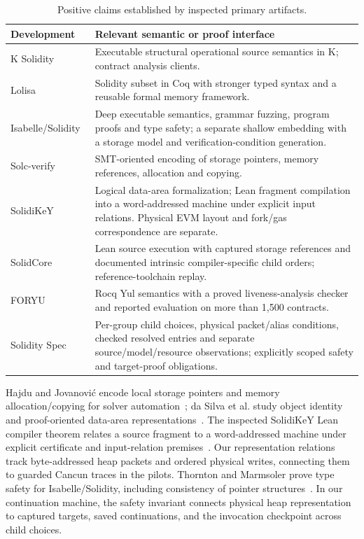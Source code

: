 \documentclass[conference]{IEEEtran}
\begin{document}
\begin{table}[t]
\caption{Positive claims established by inspected primary artifacts.}
\label{tab:related}
\small
\begin{tabularx}{\columnwidth}{@{}>{\raggedright\arraybackslash}p{}X@{}}
\toprule
Development & Relevant semantic or proof interface \\
\midrule
K Solidity~\cite{ksolidity} & Executable structural operational source semantics
in K; contract analysis clients. \\
Lolisa~\cite{lolisa} & Solidity subset in Coq with stronger typed syntax and
a reusable formal memory framework. \\
Isabelle/\allowbreak Solidity~\cite{isabelle,isabelle-safety,isabelle-shallow} & Deep executable semantics,
grammar fuzzing, program proofs and type safety; a separate shallow embedding with a
storage model and verification-condition generation. \\
Solc-verify~\cite{memory-smt} & SMT-oriented encoding of storage pointers,
memory references, allocation and copying. \\
SolidiKeY~\cite{memory-key,solidikey-lean} & Logical data-area formalization;
Lean fragment compilation into a word-addressed machine under explicit input
relations. Physical EVM layout and fork/gas correspondence are separate. \\
SolidCore~\cite{solidcore} & Lean source execution with captured storage
references and documented intrinsic compiler-specific child orders;
reference-toolchain replay. \\
FORYU~\cite{foryu} & Rocq Yul semantics with a proved liveness-analysis checker
and reported evaluation on more than 1,500 contracts. \\
Solidity Spec & Per-group child choices, physical packet/alias conditions,
checked resolved entries and separate source/model/resource observations;
explicitly scoped safety and target-proof obligations. \\
\bottomrule
\end{tabularx}
\end{table}

Hajdu and Jovanovi\'c encode local storage pointers and memory allocation/copying
for solver automation~\cite{memory-smt}; da Silva et al. study object identity
and proof-oriented data-area representations~\cite{memory-key}. The inspected
SolidiKeY Lean compiler theorem relates a source fragment to a word-addressed
machine under explicit certificate and input-relation premises~\cite{solidikey-lean}.
Our representation relations track byte-addressed heap packets and ordered
physical writes, connecting them to guarded Cancun traces in the pilots.
Thornton and Marmsoler prove type safety for Isabelle/Solidity, including
consistency of pointer structures~\cite{isabelle-safety}. In our continuation
machine, the safety invariant connects physical heap representation to captured
targets, saved continuations, and the invocation checkpoint across child choices.
\end{document}
